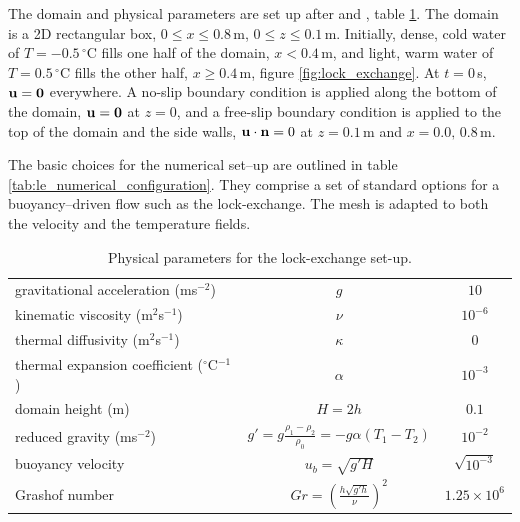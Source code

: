 The domain and physical parameters are set up after \cite{fringer_06} and \cite{hartel_00}, table \ref{tab:le_physical_parameters}. The domain is a 2D rectangular box, $0\leq x \leq 0.8\,$m, $0 \leq z \leq 0.1\,$m. Initially, dense, cold water of $T = -0.5\,^\circ$C fills one half of the domain, $x<0.4\,$m, and light, warm water of $T = 0.5\,^\circ$C fills the other half, $x\geq0.4\,$m, figure \ref{fig:lock_exchange}. At $t=0\,$s, ${\bf u} = {\bf 0}$ everywhere. A no-slip boundary condition is applied along the bottom of the domain, ${\bf u = 0}$ at $z=0$, and a free-slip boundary condition is applied to the top of the domain and the side walls, ${\bf u\cdot\bf n} = 0$ at $z = 0.1\,$m and $x = 0.0,\, 0.8\,$m.

The basic choices for the numerical set--up are outlined in table \ref{tab:le_numerical_configuration}. They comprise a set of standard options for a buoyancy--driven flow such as the lock-exchange. The mesh is adapted to both the velocity and the temperature fields.

\begin{table}[th]
\centering
\begin{tabular}[h]{l   c  c }  \hline
gravitational acceleration (ms$^{-2}$)			& $g$ 								& $10$  \\
kinematic viscosity (m$^2$s$^{-1}$)			& $\nu$								& $10^{-6}$  \\
thermal diffusivity (m$^2$s$^{-1}$)					& $\kappa$ 					& 0  \\
thermal expansion coefficient ($^\circ$C$^{-1}$)	& $\alpha$ 							& $10^{-3}$ \\
domain height (m)					& $H = 2h$							& $0.1$ \\ %
reduced gravity	(ms$^{-2}$)				& $g' = g\frac{\rho_1 - \rho_2}{\rho_0} = -g\alpha (T_1 - T_2)$	& $10^{-2}$  \\
buoyancy velocity					& $u_b = \sqrt{g'H}$ 						& $\sqrt{10^{-3}}$ \\
Grashof number						& $Gr = \left( \frac{h \sqrt{g'h}}{\nu} \right)^2$ 		& $1.25 \times 10^{6}$\\ \hline
\end{tabular}
\caption{Physical parameters for the lock-exchange set-up.}
\label{tab:le_physical_parameters}
\end{table}

